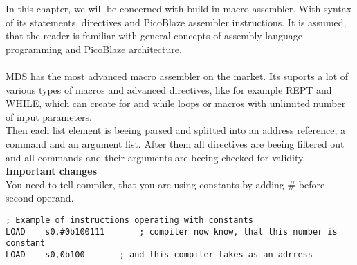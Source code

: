 
In this chapter, we will be concerned with build-in macro assembler.
With syntax of its statements, directives and PicoBlaze assembler instructions.
It is assumed, that the reader is familiar with general concepts of assembly
language programming and PicoBlaze architecture.\\\\
MDS has the most advanced macro assembler on the market. Its suports a lot of various
types of macros and advanced directives, like for example REPT and WHILE, which can create for and while loops or  macros with unlimited number of
input parameters.\\
Then each list element is beeing parsed and splitted into an address reference, a command and an argument list.
After them all directives are beeing filtered out and all commands and their arguments are beeing checked for validity.\\
\textbf{Important changes}\\
You need to tell compiler, that you are using constants by adding \# before second operand.

                \begin{code}[h!]
                        {\color{highlight_comment}\verb'; Example of instructions operating with constants'}\\
                        {\color{highlight_instruction}\verb'LOAD'}\verb'    '{\color{highlight_symbol}\verb's0,'}{\color{highlight_bin}\verb'#0b100111'}\verb'       '{\color{highlight_comment}\verb'; compiler now know, that this number is constant'}\\
                        {\color{highlight_instruction}\verb'LOAD'}\verb'    '{\color{highlight_symbol}\verb's0,'}{\color{highlight_bin}\verb'0b100'}\verb'       '{\color{highlight_comment}\verb'; and this compiler takes as an adrress'}\\
                \end{code}

